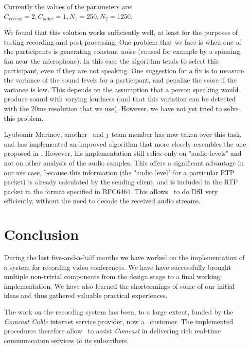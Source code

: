 \documentclass[twoside,openright,a4paper,12pt,english]{article}
\begin{document}
Currently the values of the parameters are: $C_{recent} = 2, C_{older} = 1, N_1 = 250, N_2 = 1250$.


\bigskip
We found that this solution works sufficiently well, at least for the purposes
of testing recording and post-processing. One problem that we face is when
one of the participants is generating constant noise (caused for example by a
spinning fan near the microphone). In this case the algorithm tends to select this participant,
even if they are not speaking. One suggestion for a fix is to measure the
variance of the sound levels for a participant, and penalize the score if the
variance is low. This depends on the assumption that a person speaking would
produce sound with varying loudness (and that this variation can be detected
with the 20ms resolution that we use). However, we have not yet tried to solve
this problem.

Lyubomir Marinov, another \bj\ and \j\ team member has now taken over this task, and has implemented an improved algorithm that more closely resembles the
one proposed in \cite{volfin2012}. However, his implementation still relies only on
"audio levels" and not on other analysis of the audio samples. This offers a significant advantage
in our use case, because this information (the "audio level" for a particular RTP packet) is already
calculated by the sending client, and is included in the RTP packet in the format specified in RFC6464\cite{rfc6464}.
This allows \jvb\ to do DSI very efficiently, without the need to decode the received audio streams.



\clearpage
\section{Conclusion}
\label{conclusion}
During the last five-and-a-half months we have worked on the implementation of
a system for recording video conferences. We have have successfully brought
multiple non-trivial components from the design stage to a final working implementation. We
have also learned the shortcomings of some of our initial ideas 
and thus gathered valuable practical experiences.

The work on the recording system has been, to a large extent, funded by the \emph{Comcast
Cable} internet service provider, now a \bj\ customer. The implemented
procedures therefore allow \bj\ to assist \emph{Comcast} in delivering rich
real-time communication services to its subscribers.
\end{document}
